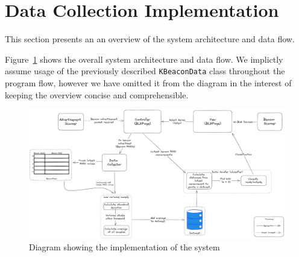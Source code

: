



\section{Data Collection Implementation}\label{sec:data_collection_implementation}
This section presents an an overview of the system architecture and data flow.

Figure~\ref{fig:implementation_diagram} shows the overall system architecture and data flow.
We implictly assume usage of the previously described \texttt{KBeaconData} class throughout the program flow, however we have omitted it from the diagram in the interest of keeping the overview concise and comprehensible.

\begin{figure}[h!]
  \centering
  \includegraphics[width=1\textwidth]{images/implementation-diagram.png}
  \caption{Diagram showing the implementation of the system}
  \label{fig:implementation_diagram}
\end{figure}

